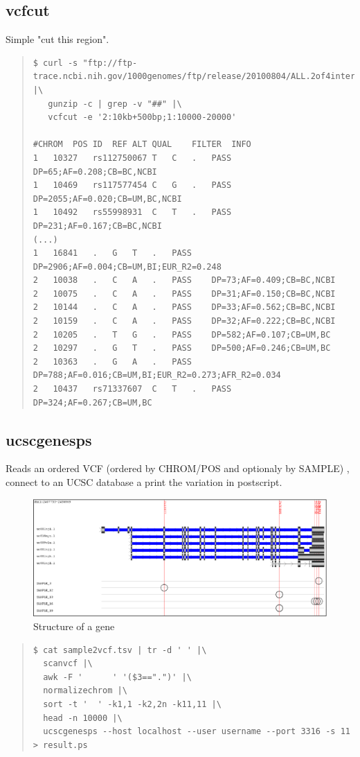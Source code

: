 \documentclass[12pt]{article}
\begin{document}
\subsection{vcfcut}
Simple "cut this region".
\begin{quote}
\begin{verbatim}
$ curl -s "ftp://ftp-trace.ncbi.nih.gov/1000genomes/ftp/release/20100804/ALL.2of4intersection.20100804.sites.vcf.gz" |\
   gunzip -c | grep -v "##" |\
   vcfcut -e '2:10kb+500bp;1:10000-20000'
   
#CHROM	POS	ID	REF	ALT	QUAL	FILTER	INFO
1	10327	rs112750067	T	C	.	PASS	DP=65;AF=0.208;CB=BC,NCBI
1	10469	rs117577454	C	G	.	PASS	DP=2055;AF=0.020;CB=UM,BC,NCBI
1	10492	rs55998931	C	T	.	PASS	DP=231;AF=0.167;CB=BC,NCBI
(...)
1	16841	.	G	T	.	PASS	DP=2906;AF=0.004;CB=UM,BI;EUR_R2=0.248
2	10038	.	C	A	.	PASS	DP=73;AF=0.409;CB=BC,NCBI
2	10075	.	C	A	.	PASS	DP=31;AF=0.150;CB=BC,NCBI
2	10144	.	C	A	.	PASS	DP=33;AF=0.562;CB=BC,NCBI
2	10159	.	C	A	.	PASS	DP=32;AF=0.222;CB=BC,NCBI
2	10205	.	T	G	.	PASS	DP=582;AF=0.107;CB=UM,BC
2	10297	.	G	T	.	PASS	DP=500;AF=0.246;CB=UM,BC
2	10363	.	G	A	.	PASS	DP=788;AF=0.016;CB=UM,BI;EUR_R2=0.273;AFR_R2=0.034
2	10437	rs71337607	C	T	.	PASS	DP=324;AF=0.267;CB=UM,BC
\end{verbatim}
\end{quote}
\subsection{ucscgenesps}
Reads an ordered VCF (ordered by CHROM/POS and optionaly by SAMPLE) , connect to an UCSC database a print the
variation in postscript.
\begin{figure}
\includegraphics[keepaspectratio=true,scale=0.45]{ucscgenes.eps}
\caption{Structure of a gene}
\end{figure}
\begin{quote}
\begin{verbatim}
$ cat sample2vcf.tsv | tr -d ' ' |\
  scanvcf |\
  awk -F '      ' '($3==".")' |\
  normalizechrom |\
  sort -t '  ' -k1,1 -k2,2n -k11,11 |\
  head -n 10000 |\
  ucscgenesps --host localhost --user username --port 3316 -s 11 > result.ps 
\end{verbatim}
\end{quote}



\end{document}
